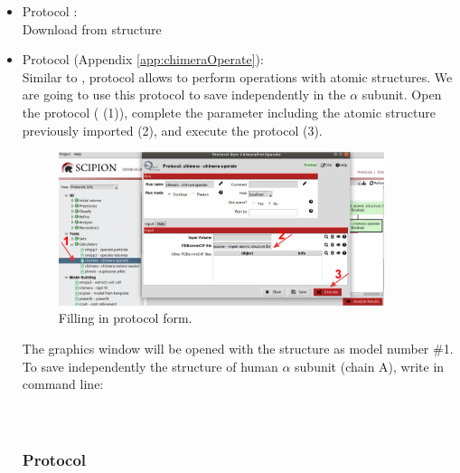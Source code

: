   \begin{itemize}
    \item Protocol :\\
    Download from  structure \\
    
    \item Protocol  (Appendix \ref{app:chimeraOperate}):\\
    Similar to \chimera {}, \chimera {} protocol allows to perform operations with atomic structures. We are going to use this protocol to save independently in \scipion the  $\alpha$ subunit. Open the protocol  ( (1)), complete the parameter  including the atomic structure  previously imported (2), and execute the protocol (3).      
    
    \begin{figure}[H]
    \centering 
    \captionsetup{width=.7\linewidth} 
    \includegraphics[width=0.90\textwidth]{Images/Fig36}
    \caption{Filling in \chimera {} protocol form.}
    \label{fig:chimera_operate_protocol}
    \end{figure}
    
    The \chimera graphics window will be opened with the structure  as model number \#1. To save independently the structure of human  $\alpha$ subunit (chain A), write in \chimera command line:\\
    \\
    \\
    
    \subsubsection*{Protocol }
    

\end{itemize}
